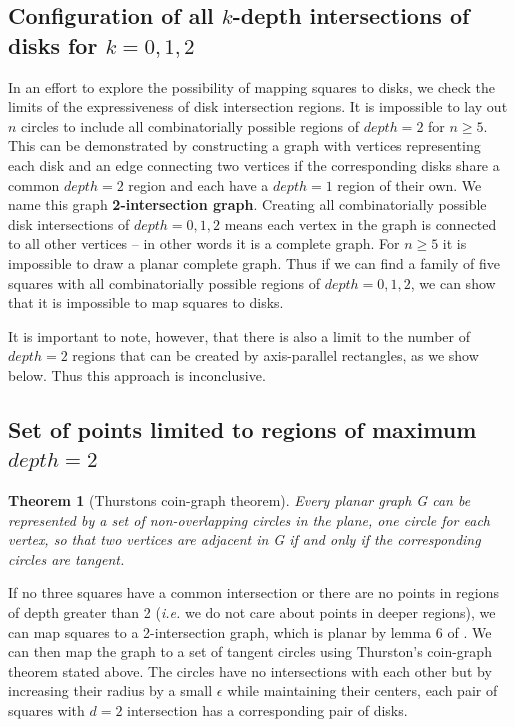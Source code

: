 \documentclass{NSF}
\newtheorem{theorem}{Theorem}[section]
\begin{document}
\subsection{Configuration of all \texorpdfstring{$k$}{k}-depth intersections of disks for \texorpdfstring{$k=0,1,2$}{k=0,1,2}}
In an effort to explore the possibility of mapping squares to disks, we check the limits of the expressiveness of disk intersection regions. It is impossible to lay out $n$ circles to include all combinatorially possible regions of $depth=2$ for $n \geq 5$. This can be demonstrated by constructing a graph with vertices representing each disk and an edge connecting two vertices if the corresponding disks share a common $depth=2$ region and each have a $depth= 1$ region of their own. We name this graph \textbf{2-intersection graph}. Creating all combinatorially possible disk intersections of $depth=0,1,2$ means each vertex in the graph is connected to all other vertices -- in other words it is a complete graph. For $n \geq 5$ it is impossible to draw a planar complete graph. Thus if we can find a family of five squares with all combinatorially possible regions of $depth=0,1,2$, we can show that it is impossible to map squares to disks.

It is important to note, however, that there is also a limit to the number of $depth=2$ regions that can be created by axis-parallel rectangles, as we show below. Thus this approach is inconclusive.

\subsection{Set of points limited to regions of maximum \texorpdfstring{$depth=2$}{depth=2} }
\label{section:thurston}
\begin{theorem}[Thurstons coin-graph theorem]
Every planar graph G can be represented by a set of non-overlapping circles in the plane, one circle for each vertex, so that two vertices are adjacent in G if and only if the corresponding circles are tangent. \cite{Brightwell:doi:10.1137/0406017}
\label{thm:thurston}
\end{theorem}
 
If no three squares have a common intersection or there are no points in regions of depth greater than 2 (\textit{i.e.} we do not care about points in deeper regions), we can map squares to a 2-intersection graph, which is planar by lemma 6 of \cite{Pyrga:2008:NEP:1377676.1377708}. We can then map the graph to a set of tangent circles using Thurston's coin-graph theorem stated above. The circles have no intersections with each other but by increasing their radius by a small $\epsilon$ while maintaining their centers, each pair of squares with $d=2$ intersection has a corresponding pair of disks.
\end{document}
